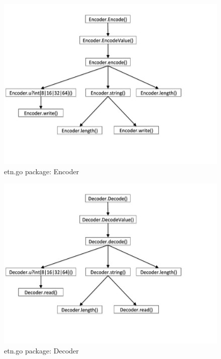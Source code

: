 \begin{figure}[H]
\centering
\includegraphics[scale=0.50]{callGraphs/etnEncoderPackage}
\caption{etn.go package: Encoder}
\end{figure}

\begin{figure}[H]
\centering
\includegraphics[scale=0.50]{callGraphs/etnDecoderPackage}
\caption{etn.go package: Decoder}
\end{figure}

